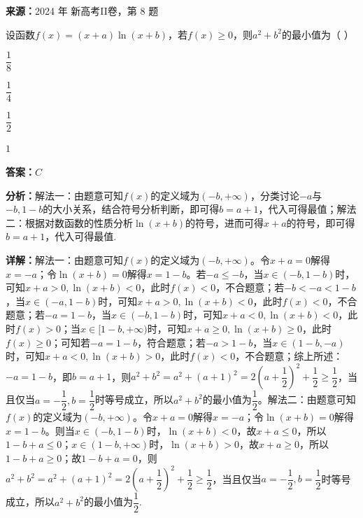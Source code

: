 \begin{question}[points=5]
\textbf{来源：}2024 年 新高考II卷，第 8 题\par
设函数$f(x)=(x+a)\ln(x+b)$，若$f(x)\ge 0$，则$a^2+b^2$的最小值为（ ）
\begin{choices}
  \item $\dfrac{1}{8}$
  \item $\dfrac{1}{4}$
  \item $\dfrac{1}{2}$
  \item $1$
\end{choices}
\begin{solution}
\textbf{答案：}$C$

\textbf{分析：}解法一：由题意可知$f(x)$的定义域为$(-b,+\infty)$，分类讨论$-a$与$-b,1-b$的大小关系，结合符号分析判断，即可得$b=a+1$，代入可得最值；解法二：根据对数函数的性质分析$\ln(x+b)$的符号，进而可得$x+a$的符号，即可得$b=a+1$，代入可得最值.

\textbf{详解：}解法一：由题意可知$f(x)$的定义域为$(-b,+\infty)$。令$x+a=0$解得$x=-a$；令$\ln(x+b)=0$解得$x=1-b$。若$-a\le -b$，当$x\in(-b,1-b)$时，可知$x+a>0,\ln(x+b)<0$，此时$f(x)<0$，不合题意；若$-b<-a<1-b$，当$x\in(-a,1-b)$时，可知$x+a>0,\ln(x+b)<0$，此时$f(x)<0$，不合题意；若$-a=1-b$，当$x\in(-b,1-b)$时，可知$x+a<0,\ln(x+b)<0$，此时$f(x)>0$；当$x\in[1-b,+\infty)$时，可知$x+a\ge0,\ln(x+b)\ge0$，此时$f(x)\ge0$；可知若$-a=1-b$，符合题意；若$-a>1-b$，当$x\in(1-b,-a)$时，可知$x+a<0,\ln(x+b)>0$，此时$f(x)<0$，不合题意；综上所述：$-a=1-b$，即$b=a+1$，则$a^2+b^2=a^2+(a+1)^2=2\left(a+\dfrac{1}{2}\right)^2+\dfrac{1}{2}\ge\dfrac{1}{2}$，当且仅当$a=-\dfrac{1}{2},b=\dfrac{1}{2}$时等号成立，所以$a^2+b^2$的最小值为$\dfrac{1}{2}$。解法二：由题意可知$f(x)$的定义域为$(-b,+\infty)$。令$x+a=0$解得$x=-a$；令$\ln(x+b)=0$解得$x=1-b$。则当$x\in(-b,1-b)$时，$\ln(x+b)<0$，故$x+a\le0$，所以$1-b+a\le0$；$x\in(1-b,+\infty)$时，$\ln(x+b)>0$，故$x+a\ge0$，所以$1-b+a\ge0$；故$1-b+a=0$，则$a^2+b^2=a^2+(a+1)^2=2\left(a+\dfrac{1}{2}\right)^2+\dfrac{1}{2}\ge\dfrac{1}{2}$，当且仅当$a=-\dfrac{1}{2},b=\dfrac{1}{2}$时等号成立，所以$a^2+b^2$的最小值为$\dfrac{1}{2}$.
\end{solution}
\end{question}

